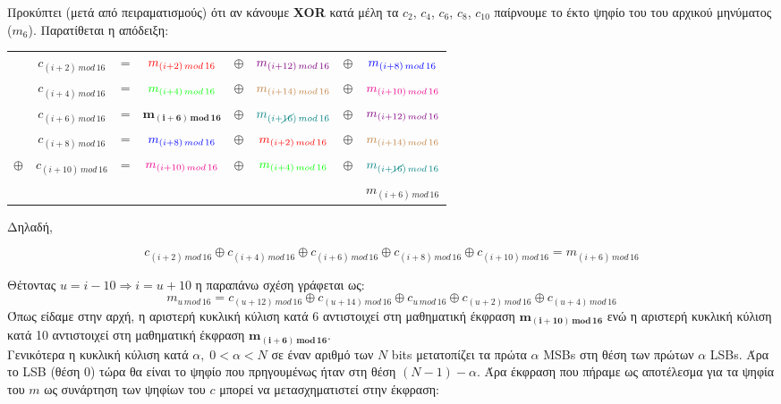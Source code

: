 \documentclass[12pt]{article}
\newcommand{\lt}{\latintext}
\newcommand{\xor}{\ensuremath{\oplus}}
\newcommand{\red}[1]{\ensuremath{\color{red} #1}}
\newcommand{\green}[1]{\ensuremath{\color{green} #1}}
\newcommand{\blue}[1]{\ensuremath{\color{blue} #1}}
\newcommand{\magenta}[1]{\ensuremath{\color{magenta} #1}}
\newcommand{\violet}[1]{\ensuremath{\color{violet} #1}}
\newcommand{\brown}[1]{\ensuremath{\color{brown} #1}}
\newcommand{\teal}[1]{\ensuremath{\color{teal} #1}}
\begin{document}
\vspace{0.1in}
\noindent
Προκύπτει (μετά από πειραματισμούς) ότι αν κάνουμε 
\textbf{{\lt XOR}} κατά μέλη τα $c_{2}$, $c_{4}$, $c_{6}$, $c_{8}$, 
$c_{10}$ παίρνουμε το έκτο ψηφίο του του αρχικού μηνύματος ($m_{6}$). Παρατίθεται η απόδειξη:
{\large
\begin{center}
\begin{tabular}{cccccccc}
       & $c_{(i+2)\,mod\,16}$ & = & $\red{m_{(i+2)\,mod\,16}}$& $\xor$ &$\violet{m_{(i+12)\,mod\,16}}$& $\xor$ & $\blue{m_{(i+8)\,mod\,16}}$\\
       & $c_{(i+4)\,mod\,16}$ & = & $\green{m_{(i+4)\,mod\,16}}$& $\xor$ &$\brown{m_{(i+14)\,mod\,16}}$& $\xor$ & $\magenta{m_{(i+10)\,mod\,16}}$\\
       & $c_{(i+6)\,mod\,16}$ & = & $\mathbf{m_{(i+6)\,mod\,16}}$& $\xor$ &$\teal{m_{(i+\cancel{16})\,mod\,16}}$& $\xor$ & $\violet{m_{(i+12)\,mod\,16}}$\\
       & $c_{(i+8)\,mod\,16}$ & = & $\blue{m_{(i+8)\,mod\,16}}$& $\xor$ &$\red{m_{(i+2)\,mod\,16}}$& $\xor$ & $\brown{m_{(i+14)\,mod\,16}}$\\
$\xor$ & $c_{(i+10)\,mod\,16}$ & = & $\magenta{m_{(i+10)\,mod\,16}}$& $\xor$ &$\green{m_{(i+4)\,mod\,16}}$& $\xor$ & $\teal{m_{(i+\cancel{16})\,mod\,16}}$\\

\hline
 & & & & & & & $m_{(i+6)\,mod\,16}$ \\
\end{tabular}
\end{center}
}
Δηλαδή, 

{\large
\[
c_{(i+2)\,mod\,16} \xor c_{(i+4)\,mod\,16} \xor c_{(i+6)\,mod\,16} \xor c_{(i+8)\,mod\,16} \xor c_{(i+10)\,mod\,16} = m_{(i+6)\,mod\,16}
\]
}

\pagebreak

Θέτοντας $u = i - 10 \Rightarrow i = u + 10$ η παραπάνω σχέση γράφεται ως:
{\large
\[
m_{u\,mod\,16} = c_{(u+12)\,mod\,16} \xor c_{(u+14)\,mod\,16} \xor c_{u\,mod\,16} \xor c_{(u+2)\,mod\,16} \xor c_{(u+4)\,mod\,16}
\]
}
\indent
Όπως είδαμε στην αρχή, η αριστερή κυκλική κύλιση κατά 6 αντιστοιχεί στη μαθηματική έκφραση $\mathbf{m_{(i+10)\,mod\,16}}$ ενώ η αριστερή κυκλική κύλιση κατά 10 αντιστοιχεί στη μαθηματική έκφραση $\mathbf{m_{(i+6)\,mod\,16}}$.\\
\indent
Γενικότερα η κυκλική κύλιση κατά $\alpha,\; 0 < \alpha < N$
σε έναν αριθμό των $N$ {\lt bits} μετατοπίζει τα πρώτα $\alpha$ {\lt MSBs} στη θέση των πρώτων $\alpha$ {\lt LSBs}. 
Άρα το {\lt LSB} (θέση 0) τώρα θα είναι το ψηφίο που πρηγουμένως ήταν στη θέση $(N-1) - \alpha$. 
Άρα έκφραση που πήραμε ως αποτέλεσμα για τα ψηφία του $m$ ως συνάρτηση των ψηφίων του $c$ μπορεί να μετασχηματιστεί στην έκφραση:
\end{document}
